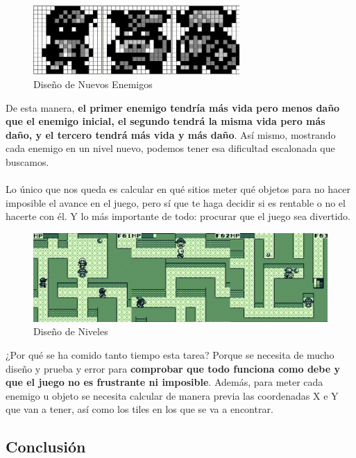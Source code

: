 \begin{figure}[h]
\centering
\includegraphics[width=0.7\textwidth]{include/images/desarrollo/newenemies.jpg}
\caption{Diseño de Nuevos Enemigos}
\label{figure:newenemies}
\end{figure}

De esta manera, \textbf{el primer enemigo tendría más vida pero menos daño que el enemigo inicial, el segundo tendrá la misma vida pero más daño, y el tercero tendrá más vida y más daño}. Así mismo, mostrando cada enemigo en un nivel nuevo,  podemos tener esa dificultad escalonada que buscamos. 
\\ \\
Lo único que nos queda es calcular en qué sitios meter qué objetos para no hacer imposible el avance en el juego, pero sí que te haga decidir si es rentable o no el hacerte con él. Y lo más importante de todo: procurar que el juego sea divertido.

\begin{figure}[h]
\centering
\includegraphics[width=1\textwidth]{include/images/desarrollo/leveldesign.png}
\caption{Diseño de Niveles}
\label{figure:leveldesign}
\end{figure}

¿Por qué se ha comido tanto tiempo esta tarea? Porque se necesita de mucho diseño y prueba y error para \textbf{comprobar que todo funciona como debe y que el juego no es frustrante ni imposible}. Además, para meter cada enemigo u objeto se necesita calcular de manera previa las coordenadas X e Y que van a tener, así como los tiles en los que se va a encontrar.

\subsection{Conclusión}

